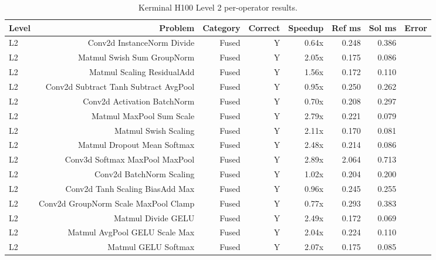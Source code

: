 \begin{table}[t]
\centering
\small
\caption{Kerminal H100 Level 2 per-operator results.}
\label{tab:kerminal-l2}
\begin{tabular}{lrrrrrrr}
\toprule
Level & Problem & Category & Correct & Speedup & Ref ms & Sol ms & Error \\
\midrule
L2 & Conv2d InstanceNorm Divide & Fused & Y & 0.64x & 0.248 & 0.386 &  \\
L2 & Matmul Swish Sum GroupNorm & Fused & Y & 2.05x & 0.175 & 0.086 &  \\
L2 & Matmul Scaling ResidualAdd & Fused & Y & 1.56x & 0.172 & 0.110 &  \\
L2 & Conv2d Subtract Tanh Subtract AvgPool & Fused & Y & 0.95x & 0.250 & 0.262 &  \\
L2 & Conv2d Activation BatchNorm & Fused & Y & 0.70x & 0.208 & 0.297 &  \\
L2 & Matmul MaxPool Sum Scale & Fused & Y & 2.79x & 0.221 & 0.079 &  \\
L2 & Matmul Swish Scaling & Fused & Y & 2.11x & 0.170 & 0.081 &  \\
L2 & Matmul Dropout Mean Softmax & Fused & Y & 2.48x & 0.214 & 0.086 &  \\
L2 & Conv3d Softmax MaxPool MaxPool & Fused & Y & 2.89x & 2.064 & 0.713 &  \\
L2 & Conv2d BatchNorm Scaling & Fused & Y & 1.02x & 0.204 & 0.200 &  \\
L2 & Conv2d Tanh Scaling BiasAdd Max & Fused & Y & 0.96x & 0.245 & 0.255 &  \\
L2 & Conv2d GroupNorm Scale MaxPool Clamp & Fused & Y & 0.77x & 0.293 & 0.383 &  \\
L2 & Matmul Divide GELU & Fused & Y & 2.49x & 0.172 & 0.069 &  \\
L2 & Matmul AvgPool GELU Scale Max & Fused & Y & 2.04x & 0.224 & 0.110 &  \\
L2 & Matmul GELU Softmax & Fused & Y & 2.07x & 0.175 & 0.085 &  \\
\bottomrule
\end{tabular}
\end{table}
